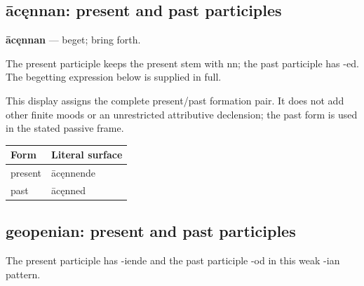 \subsection*{ācęnnan: present and past participles}

\par\begin{minipage}{\linewidth}\raggedright
\textbf{ācęnnan} — beget; bring forth.

The present participle keeps the present stem with nn; the past participle has -ed. The begetting expression below is supplied in full.

This display assigns the complete present/\allowbreak{}past formation pair. It does not add other finite moods or an unrestricted attributive declension; the past form is used in the stated passive frame.

\par\begingroup
\fontsize{10.5}{13.2}\selectfont
\setlength{\LTleft}{0pt}\setlength{\LTright}{\fill}
\noindent
\begin{tabular}{@{}>{\raggedright\arraybackslash}p{55.85mm}>{\raggedright\arraybackslash}p{65.34mm}@{}}
\toprule
\textbf{Form} & \textbf{Literal surface} \\
\midrule
present & ācęnnende \\
past & ācęnned \\
\bottomrule
\end{tabular}
\par\endgroup

\end{minipage}\par
{}
\subsection*{geopenian: present and past participles}

The present participle has -iende and the past participle -od in this weak -ian pattern.

